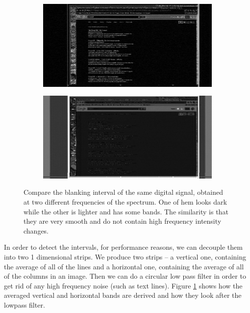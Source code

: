 \documentclass[a4paper,12pt,twoside,openright]{report}
\begin{document}
\begin{figure}[h]
\centering
\begin{subfigure}[b]{0.6\textwidth}
  \includegraphics[width=\textwidth]{sync_black}
\end{subfigure} \vspace{0.5cm}\vfill
\begin{subfigure}[b]{0.6\textwidth}
  \includegraphics[width=\textwidth]{sync_gray}
\end{subfigure}
\caption{Compare the blanking interval of the same digital signal, obtained at two different frequencies of the spectrum. One of hem looks dark while the other is lighter and has some bands. The similarity is that they are very smooth and do not contain high frequency intensity changes.}
\label{fig:syncing}
\end{figure}

In order to detect the intervals, for performance reasons, we can decouple them into two 1 dimensional strips. We produce two strips -- a vertical one, containing the average of all of the lines and a horizontal one, containing the average of all of the columns in an image. Then we can do a circular low pass filter in order to get rid of any high frequency noise (such as text lines). Figure \ref{fig:syncing} shows how the averaged vertical and horizontal bands are derived and how they look after the lowpass filter.
\end{document}
